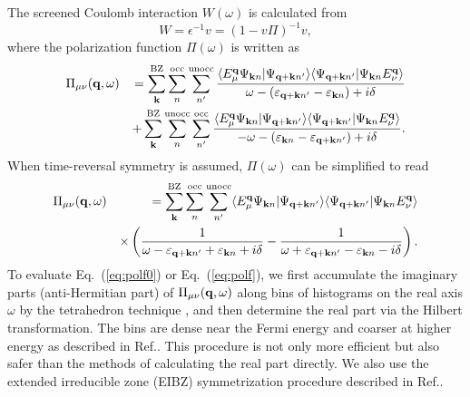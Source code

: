 \documentclass[a4paper,10pt,epsf,fleqn]{article}
\def\Psikn{\Psi_{{\bf k}n}}
\def\Psikn{{\Psi_{{\bf k}n}}}
\newcommand{\bfq}{{\bf q}}
\newcommand{\bfk}{{\bf k}}
\newcommand{\ispone}{}
\newcommand{\isptwo}{}
\newcommand{\req}[1]{\mbox{Eq.~(\ref{#1})}}
\begin{document}
The screened Coulomb interaction $W(\omega)$ is calculated from
\begin{equation}
 W = \epsilon^{-1} v = \left(1-v \Pi\right)^{-1} v,
\label{eq:defw}
\end{equation}
where the polarization function $\Pi(\omega)$
is written as
\begin{eqnarray}
\Pi_{\mu \nu}({\bf q},\omega)
&&=
\sum^{\rm BZ}_{\bfk} \sum^{\rm occ}_{n \ispone} \sum^{\rm unocc}_{n'\isptwo}
\frac{
\langle E^{\bf q}_\mu \Psikn |\Psi_{{\bf q+k}n'} \rangle
\langle \Psi_{{\bf q+k}n'}| \Psikn E^{\bf q}_\nu \rangle
}{\omega-(\varepsilon_{{\bf q+k} n'\isptwo}-\varepsilon_{\bfk n\ispone})+i \delta} \nonumber\\
&&+ \sum^{\rm BZ}_{\bfk} \sum^{\rm  unocc}_{n \ispone} \sum^{\rm occ}_{n'\isptwo}
\frac{
\langle E^{\bf q}_\mu \Psi_{{\bf k}n} |\Psi_{{\bf q+k}n'} \rangle
\langle \Psi_{{\bf q+k}n'}| \Psi_{{\bf k}n} E^{\bf q}_\nu \rangle
}{-\omega-(\varepsilon_{\bfk n\ispone}-\varepsilon_{{\bf q+k} n'\isptwo})+i \delta}.
\label{eq:polf0}
\end{eqnarray}
When time-reversal symmetry is assumed, $\Pi(\omega)$ can be simplified to read
\begin{eqnarray}
\Pi_{\mu \nu}({\bf q},\omega)
&&=\sum^{\rm BZ}_{{\bf k}}  \sum^{\rm  occ}_{n} \sum^{\rm  unocc}_{n'}
\langle E^{\bf q}_\mu \Psi_{{\bf k}n} |\Psi_{{\bf q+k}n'} \rangle
\langle \Psi_{{\bf q+k}n'}| \Psi_{{\bf k}n} E^{\bf q}_\nu \rangle \nonumber \\
&& \times
\left(\frac{1}{\omega-\varepsilon_{{\bf q+k}n'}+\varepsilon_{{\bf k}n}+i \delta}
-\frac{1}{\omega+\varepsilon_{{\bf q+k}n'}-\varepsilon_{{\bf k}n}-i \delta}\right). \label{dieele}
\label{eq:polf}
\end{eqnarray}
To evaluate \req{eq:polf0} or \req{eq:polf},
we first accumulate the imaginary parts (anti-Hermitian part) of $\Pi_{\mu \nu}(\bfq,\omega)$
along bins of histograms on the real axis $\omega$
by the tetrahedron technique \cite{rath_generalized_1975},
and then determine the real part via the Hilbert transformation.
The bins are dense near the Fermi energy and coarser at higher energy as described in 
Ref.\cite{kotani_quasiparticle_2007}.
This procedure is not only more efficient but also safer than the methods
of calculating the real part directly. 
We also use the extended irreducible zone (EIBZ) 
symmetrization procedure described in Ref.\cite{friedrich_efficient_2010}.
\end{document}

